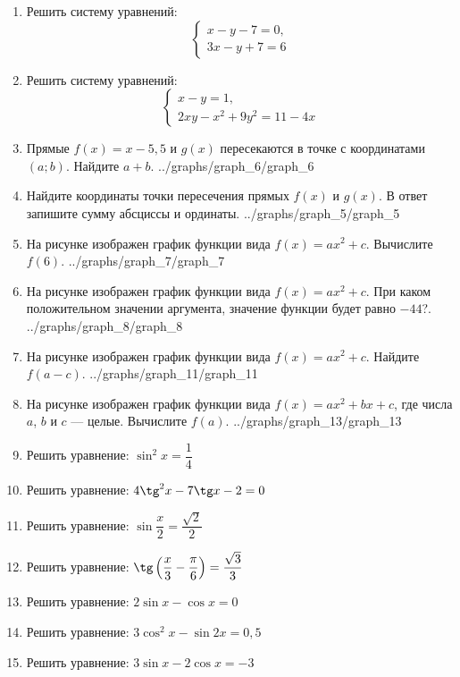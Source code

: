 \documentclass[12pt, a4paper]{article}
\begin{document}
	  
	\begin{enumerate}
		\item Решить систему уравнений:
		$$\left\{
		\begin{array}{l}
			x-y-7=0,\\
			3x-y+7=6
		\end{array}
		\right.$$
		\item Решить систему уравнений:
		$$\left\{
		\begin{array}{l}
			x-y=1,\\
			2xy-x^2+9y^2=11-4x
		\end{array}
		\right.$$
		\item \funcexer
		{Прямые $f(x)=x-5,5$ и $g(x)$ пересекаются в точке с координатами $(a;b)$. Найдите $a+b$.}
		{../graphs/graph_6/graph_6}
		\item \funcexer
		{Найдите координаты точки пересечения прямых $f(x)$ и $g(x)$. В ответ запишите сумму абсциссы и ординаты.}
		{../graphs/graph_5/graph_5}
		\item \funcexer
		{На рисунке изображен график функции вида $f(x)=ax^2+c$. Вычислите $f(6)$.}
		{../graphs/graph_7/graph_7}
		\item \funcexer
		{На рисунке изображен график функции вида $f(x)=ax^2+c$. При каком положительном значении аргумента, значение функции будет равно $-44$?.}
		{../graphs/graph_8/graph_8}
		\item \funcexer
		{На рисунке изображен график функции вида $f(x)=ax^2+c$. Найдите $f(a-c)$.}
		{../graphs/graph_11/graph_11}
		\item \funcexer
		{На рисунке изображен график функции вида $f(x)=ax^2+bx+c$, где числа $a$, $b$ и $c$ — целые. Вычислите $f(a)$.}
		{../graphs/graph_13/graph_13}
		\item Решить уравнение: $\sin^2 x = \dfrac{1}{4}$
		\item Решить уравнение: $4\tg^2 x - 7 \tg x - 2 = 0$
		\item Решить уравнение: $\sin \dfrac{x}{2}=\dfrac{\sqrt{2}}{2}$
		\item Решить уравнение: $\tg \left(\dfrac{x}{3}-\dfrac{\pi}{6}\right)=\dfrac{\sqrt{3}}{3}$
		\item Решить уравнение: $2\sin x - \cos x=0$
		\item Решить уравнение: $3\cos^2 x - \sin 2x = 0,5$
		\item Решить уравнение: $3\sin x - 2\cos x=-3$
	\end{enumerate}
\end{document}
